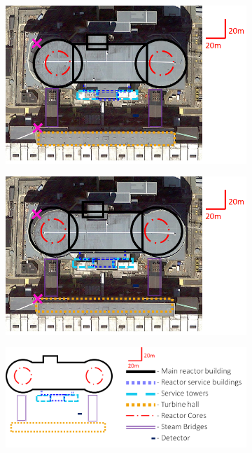 \begin{figure}[!h]
\centering
\begin{subfigure}{.5\textwidth}
  \centering
  \includegraphics[width=\linewidth]{Chapter6/Figs/wylfaTraceStep1NoLeg.png}
  \captionsetup{width=.9\linewidth}
  \caption{}
  \label{subFig:wylfaTraceStep1}
\end{subfigure}%
\begin{subfigure}{.5\textwidth}
  \centering
\includegraphics[width=\linewidth]{Chapter6/Figs/wylfaTraceStep2NoLeg.png}
  \captionsetup{width=.9\linewidth}
  \caption{}
  \label{subFig:wylfaTraceStep2}
\end{subfigure}
\begin{subfigure}{1.0\textwidth}
  \centering
\includegraphics[width=\linewidth]{Chapter5/Figs/wylfaRasterNew/wylfaTraceStep4.png}

\end{subfigure}
\end{figure}
